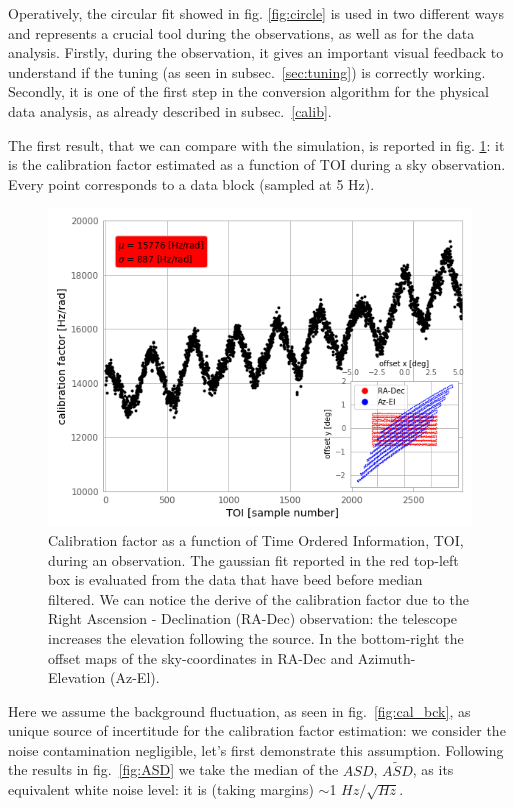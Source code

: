 \documentclass[twocolumn,traditabstract]{aa}\\
\begin{document}
\noindent Operatively, the circular fit showed in fig. \ref{fig:circle} is used in two different ways and represents a crucial tool during the observations, as well as for the data analysis. Firstly, during the observation, it gives an important visual feedback to understand if the tuning (as seen in subsec.~\ref{sec:tuning}) is correctly working. Secondly, it is one of the first step in the conversion algorithm for the physical data analysis, as already described in subsec.~\ref{calib}.

The first result, that we can compare with the simulation, is reported in fig. \ref{fig:calfact}: it is the calibration factor estimated as a function of TOI during a sky observation. Every point corresponds to a data block (sampled at 5 Hz).

\begin{figure}[htf]
	\centering
	\includegraphics[width=.5\textwidth]{4.results/calfact.png}
	\caption{Calibration factor as a function of Time Ordered Information, TOI, during an observation. The gaussian fit reported in the red top-left box is evaluated from the data that have beed before median filtered. We can notice the derive of the calibration factor due to the Right Ascension - Declination (RA-Dec) observation: the telescope increases the elevation following the source. In the bottom-right the offset maps of the sky-coordinates in RA-Dec and Azimuth-Elevation (Az-El).}
	\label{fig:calfact}
\end{figure}


Here we assume the background fluctuation, as seen in fig.~\ref{fig:cal_bck}, as unique source of incertitude for the calibration factor estimation: we consider the noise contamination negligible, let's first demonstrate this assumption. Following the results in fig.~\ref{fig:ASD} we take the median of the $ASD$, $\tilde{ASD}$, as its equivalent white noise level: it is (taking margins) $\sim$1 $Hz/\sqrt{Hz}$.
\end{document}
